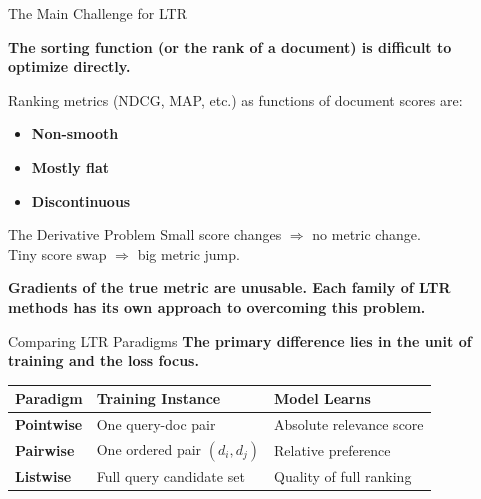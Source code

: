 \documentclass[aspectratio=169]{beamer}
\begin{document}
\begin{frame}{The Main Challenge for LTR}

\textbf{The sorting function (or the rank of a document) is difficult to optimize directly.}

\vspace{0.8em}
Ranking metrics (NDCG, MAP, etc.) as functions of document scores are:
\begin{itemize}
    \item \textbf{Non-smooth}
    \item \textbf{Mostly flat}
    \item \textbf{Discontinuous}
\end{itemize}

\bigskip
\begin{exampleblock}{The Derivative Problem}
Small score changes $\Rightarrow$ no metric change.\\
Tiny score swap $\Rightarrow$ big metric jump.
\end{exampleblock}

\vspace{0.5em}
\textbf{Gradients of the true metric are unusable. Each family of LTR methods has its own approach to overcoming this problem.}
\end{frame}

\begin{frame}{Comparing LTR Paradigms}
\textbf{The primary difference lies in the unit of training and the loss focus.}

\vspace{1.5em}
\begin{center}
\begin{tabular}{lll}
\toprule
\textbf{Paradigm} & \textbf{Training Instance} & \textbf{Model Learns} \\
\midrule
\textbf{Pointwise} & One query-doc pair & Absolute relevance score \\
\textbf{Pairwise} & One ordered pair $(d_i, d_j)$ & Relative preference \\
\textbf{Listwise} & Full query candidate set & Quality of full ranking \\
\bottomrule
\end{tabular}
\end{center}

\end{frame}


\end{document}
